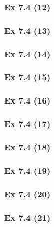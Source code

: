 \subsubsection{Ex 7.4 (12)}\label{sec:Ex_7.4.12}

\subsubsection{Ex 7.4 (13)}\label{sec:Ex_7.4.13}

\subsubsection{Ex 7.4 (14)}\label{sec:Ex_7.4.14}

\subsubsection{Ex 7.4 (15)}\label{sec:Ex_7.4.15}

\subsubsection{Ex 7.4 (16)}\label{sec:Ex_7.4.16}

\subsubsection{Ex 7.4 (17)}\label{sec:Ex_7.4.17}

\subsubsection{Ex 7.4 (18)}\label{sec:Ex_7.4.18}

\subsubsection{Ex 7.4 (19)}\label{sec:Ex_7.4.19}

\subsubsection{Ex 7.4 (20)}\label{sec:Ex_7.4.20}

\newpage		%

\subsubsection{Ex 7.4 (21)}\label{sec:Ex_7.4.21}

